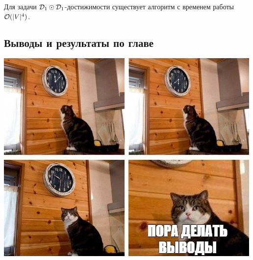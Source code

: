 \begin{theorem}
  Для задачи $\mathcal{D}_1 \odot \mathcal{D}_1$-достижимости существует алгоритм с временем работы $\mathcal{O}(|V|^4)$.
\end{theorem}

\subsection{Выводы и результаты по главе}

\includegraphics[width=0.75\linewidth]{img/conclusion_cat}

\TODO{}